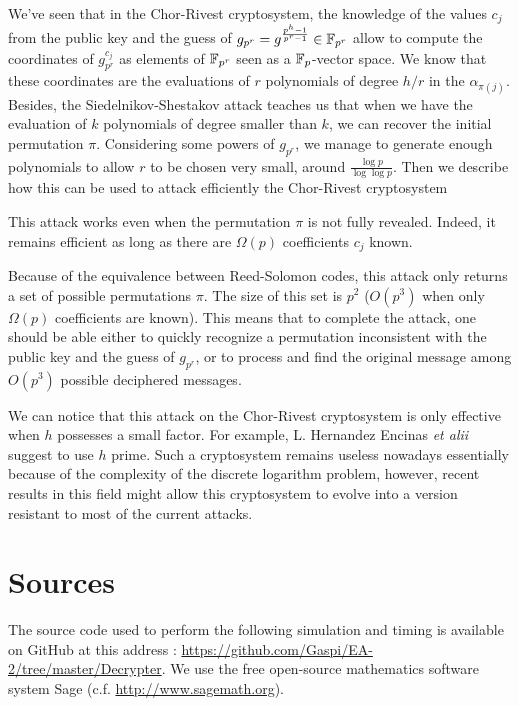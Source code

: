 \documentclass[a4paper]{article}
\begin{document}
We've seen that in the Chor-Rivest cryptosystem, the knowledge of the values $c_j$ from the public key and the guess of $g_{p^r} = g^{\frac{p^h-1}{p^r-1}} \in \mathbb{F}_{p^r}$ allow to compute the coordinates of $g_{p^r}^{c_j}$ as elements of $\mathbb{F}_{p^r}$ seen as a $\mathbb{F}_p$-vector space. We know that these coordinates are the evaluations of $r$ polynomials of degree $h/r$ in the $\alpha_{\pi(j)}$. Besides, the Siedelnikov-Shestakov attack teaches us that when we have the evaluation of $k$ polynomials of degree smaller than $k$, we can recover the initial permutation $\pi$. Considering some powers of $g_{p^r}$, we manage to generate enough polynomials to allow $r$ to be chosen very small, around $\frac{\log p}{\log \log p}$. Then we describe how this can be used to attack efficiently the Chor-Rivest cryptosystem

This attack works even when the permutation $\pi$ is not fully revealed. Indeed, it remains efficient as long as there are $\Omega(p)$ coefficients $c_j$ known.

Because of the equivalence between Reed-Solomon codes, this attack only returns a set of possible permutations $\pi$. The size of this set is $p^2$ ($O(p^3)$ when only $\Omega(p)$ coefficients are known). This means that to complete the attack, one should be able either to quickly recognize a permutation inconsistent with the public key and the guess of $g_{p^r}$, or to process and find the original message among $O(p^3)$ possible deciphered messages.

We can notice that this attack on the Chor-Rivest cryptosystem is only effective when $h$ possesses a small factor. For example, L. Hernandez Encinas \textit{et alii} \cite{Enc04} suggest to use $h$ prime. Such a cryptosystem remains useless nowadays essentially because of the complexity of the discrete logarithm problem, however, recent results in this field might allow this cryptosystem to evolve into a version resistant to most of the current attacks.







\newpage
\appendix
\section{Sources}

The source code used to perform the following simulation and timing is available on GitHub at this address : \url{https://github.com/Gaspi/EA-2/tree/master/Decrypter}. We use the free open-source mathematics software system Sage (c.f. \url{http://www.sagemath.org}).\\
\end{document}
